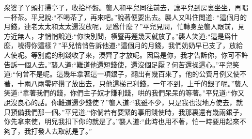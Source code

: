 \begin{parag}
    衆婆子丫頭打掃亭子，收拾杯盤。襲人和平兒同往前去，讓平兒到房裏坐坐，再喝一杯茶。平兒說:“不喝茶了，再來吧。”說著便要出去。襲人又叫住問道: “這個月的月錢，連老太太和太太還沒放呢，是爲什麼？”平兒見問，忙轉身至襲人跟前，見方近無人，才悄悄說道:“你快別問，橫豎再遲幾天就放了。”襲人笑道:“這是爲什麼，唬得你這樣？”平兒悄悄告訴他道:“這個月的月錢，我們奶奶早已支了，放給人使呢。等別處的利錢收了來，湊齊了才放呢。因爲是你，我才告訴你，你可不許告訴一個人去。”襲人道:“難道他還短錢使，還沒個足厭？何苦還操這心。”平兒笑道:“何曾不是呢。這幾年拿著這一項銀子，翻出有幾百來了。他的公費月例又使不著，十兩八兩零碎攢了放出去，只他這梯己利錢，一年不到，上千的銀子呢。”襲人笑道:“拿著我們的錢，你們主子奴才賺利錢，哄的我們呆呆的等著。”平兒道:“你又說沒良心的話。你難道還少錢使？”襲人道:“我雖不少，只是我也沒地方使去，就只預備我們那一個。”平兒道:“你倘若有要緊的事用錢使時，我那裏還有幾兩銀子，你先拿來使，明兒我扣下你的就是了。”襲人道:“此時也用不著，怕一時要用起來不夠了，我打發人去取就是了。”
\end{parag}


